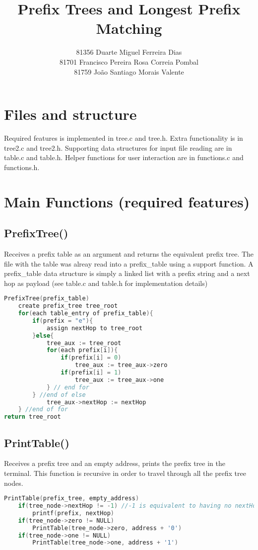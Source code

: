 \documentclass[a4paper]{article}
\date{\displaydate{date}}
\title{Prefix Trees and Longest Prefix Matching}
\author{81356    Duarte Miguel Ferreira Dias\\
        81701    Francisco Pereira Rosa Correia Pombal\\
        81759    João Santiago Morais Valente}
\begin{document}
\maketitle
\section{Files and structure}
Required features is implemented in tree.c and tree.h. Extra functionality is in tree2.c and tree2.h. Supporting data structures for input file reading are in table.c and table.h. Helper functions for user interaction are in functions.c and functions.h.
\section{Main Functions (required features)}

\subsection{PrefixTree()}

Receives a prefix table as an argument and returns the equivalent prefix tree. The file with the table was alreay read into a prefix\_table using a support function. A prefix\_table data structure is simply a linked list with a prefix string and a next hop as payload (see table.c and table.h for implementation details)
\begin{lstlisting}[language=c]
PrefixTree(prefix_table)
    create prefix_tree tree_root
    for(each table_entry of prefix_table){
        if(prefix = "e"){
            assign nextHop to tree_root
        }else{
            tree_aux := tree_root
            for(each prefix[i]){
                if(prefix[i] = 0)
                    tree_aux := tree_aux->zero
                if(prefix[i] = 1)
                    tree_aux := tree_aux->one
            } // end for
        } //end of else
            tree_aux->nextHop := nextHop
    } //end of for
return tree_root
\end{lstlisting}

\subsection{PrintTable()}

Receives a prefix tree and an empty address, prints the prefix tree in the terminal. This function is recursive in order to travel through all the prefix tree nodes.
\begin{lstlisting}[language=c]
PrintTable(prefix_tree, empty_address)
    if(tree_node->nextHop != -1) //-1 is equivalent to having no nextHop
        printf(prefix, nextHop)
    if(tree_node->zero != NULL)
        PrintTable(tree_node->zero, address + '0')
    if(tree_node->one != NULL)
        PrintTable(tree_node->one, address + '1')
\end{lstlisting}
\end{document}
